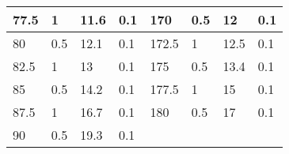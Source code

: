 \begin{table}[]
\begin{tabular}{|l|l|l|l||l|l|l|l|}
77.5  & 1           & 11.6            & 0.1         & 170   & 0.5         & 12              & 0.1         \\ \hline
80    & 0.5         & 12.1            & 0.1         & 172.5 & 1           & 12.5            & 0.1         \\ \hline
82.5  & 1           & 13              & 0.1         & 175   & 0.5         & 13.4            & 0.1         \\ \hline
85    & 0.5         & 14.2            & 0.1         & 177.5 & 1           & 15              & 0.1         \\ \hline
87.5  & 1           & 16.7            & 0.1         & 180   & 0.5         & 17              & 0.1         \\ \hline
90    & 0.5         & 19.3            & 0.1         &       &             &                 &             \\ \hline
\end{tabular}
\end{table}

